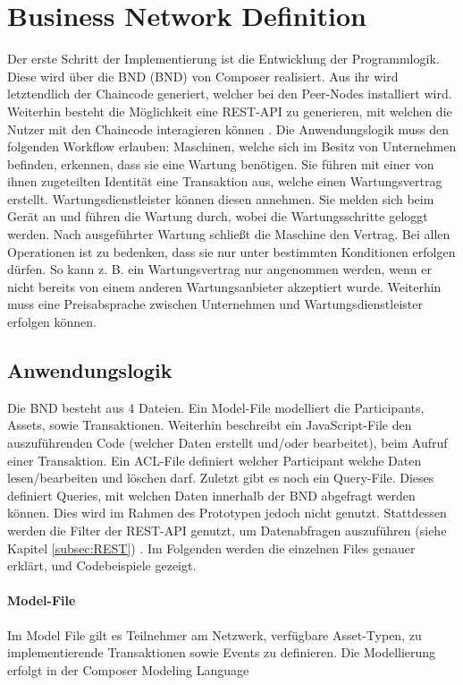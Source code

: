 \section{Business Network Definition}
Der erste Schritt der Implementierung ist die Entwicklung der Programmlogik. Diese wird über die \acl{BND} (\acs{BND}) von Composer realisiert. Aus ihr wird letztendlich der Chaincode generiert, welcher bei den Peer-Nodes installiert wird. Weiterhin besteht die Möglichkeit eine REST-API zu generieren, mit welchen die Nutzer mit den Chaincode interagieren können \cite{HyperledgerComposerTeamDeveloperTutorialHyperledger}. Die Anwendungslogik muss den folgenden Workflow erlauben: Maschinen, welche sich im Besitz von Unternehmen befinden, erkennen, dass sie eine Wartung benötigen. Sie führen mit einer von ihnen zugeteilten Identität eine Transaktion aus, welche einen Wartungsvertrag erstellt. Wartungsdienstleister können diesen annehmen. Sie melden sich beim Gerät an und führen die Wartung durch, wobei die Wartungsschritte geloggt werden. Nach ausgeführter Wartung schließt die Maschine den Vertrag. Bei allen Operationen ist zu bedenken, dass sie nur unter bestimmten Konditionen erfolgen dürfen. So kann z. B. ein Wartungsvertrag nur angenommen werden, wenn er nicht bereits von einem anderen Wartungsanbieter akzeptiert wurde. Weiterhin muss eine Preisabsprache zwischen Unternehmen und Wartungsdienstleister erfolgen können. 

\subsection{Anwendungslogik}
Die \acs{BND} besteht aus 4 Dateien. Ein Model-File modelliert die Participants, Assets, sowie Transaktionen. Weiterhin beschreibt ein JavaScript-File den auszuführenden Code (welcher Daten erstellt und/oder bearbeitet), beim Aufruf einer Transaktion. Ein ACL-File definiert welcher Participant welche Daten lesen/bearbeiten und löschen darf. Zuletzt gibt es noch ein Query-File. Dieses definiert Queries, mit welchen Daten innerhalb der \acs{BND} abgefragt werden können. Dies wird im Rahmen des Prototypen jedoch nicht genutzt. Stattdessen werden die Filter der REST-API genutzt, um Datenabfragen auszuführen (siehe Kapitel \ref{subsec:REST}) \cite{HyperledgerComposerTeamIntroductionHyperledgerComposer}. Im Folgenden werden die einzelnen Files genauer erklärt, und Codebeispiele gezeigt.

\paragraph{Model-File}
Im Model File gilt es Teilnehmer am Netzwerk, verfügbare Asset-Typen, zu implementierende Transaktionen sowie Events zu definieren. Die Modellierung erfolgt in der Composer Modeling Language \cite{HyperledgerComposerTeamModelingLanguageHyperledger}

